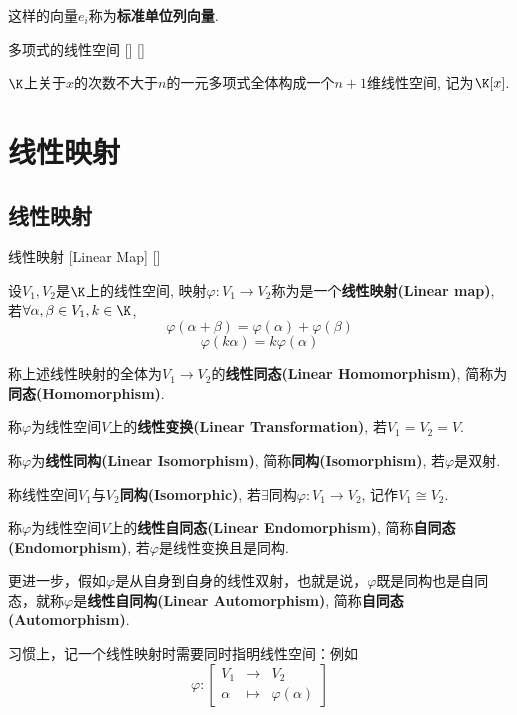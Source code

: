 \documentclass[UTF8]{ctexart}
\begin{document}
\begin{xmp}
			这样的向量$e_i$称为\textbf{标准单位列向量}. 
		\end{xmp}
		
		\begin{xmp}
			[]
			{多项式的线性空间}
			[]
			[]

			$\K$上关于$x$的次数不大于$n$的一元多项式全体构成一个$n+1$维线性空间, 记为$\K[x]$. 
		\end{xmp}
		
		
		
\section{线性映射}

	\subsection{线性映射}
		
		\begin{dfn}
			[]
			{线性映射}
			[Linear Map]
			[]

			设$V_{1},V_{2}$是$\K$上的线性空间, 映射$\varphi: V_{1}\to V_{2}$称为是一个\textbf{线性映射(Linear map)}, 若$\forall \alpha, \beta\in V_{1}, k\in \K$, 
			\[\varphi (\alpha+\beta)=\varphi(\alpha)+\varphi(\beta)\]
			\[\varphi(k\alpha)=k\varphi(\alpha)\]

			称上述线性映射的全体为$V_1\to V_2$的\textbf{线性同态(Linear Homomorphism)}, 简称为\textbf{同态(Homomorphism)}.
			
			称$\varphi$为线性空间$V$上的\textbf{线性变换(Linear Transformation)}, 若$V_{1}=V_{2}=V$. 
			
			称$\varphi$为\textbf{线性同构(Linear Isomorphism)}, 简称\textbf{同构(Isomorphism)}, 若$\varphi$是双射. 
			
			称线性空间$V_1$与$V_2$\textbf{同构(Isomorphic)}, 若$\exists$同构$\varphi:V_1\to V_2$, 记作$V_1\cong V_2$. 
			
			称$\varphi$为线性空间$V$上的\textbf{线性自同态(Linear Endomorphism)}, 简称\textbf{自同态(Endomorphism)}, 若$\varphi$是线性变换且是同构. 

			更进一步，假如$\varphi$是从自身到自身的线性双射，也就是说，$\varphi$既是同构也是自同态，就称$\varphi$是\textbf{线性自同构(Linear Automorphism)}, 简称\textbf{自同态(Automorphism)}.
		\end{dfn}

		习惯上，记一个线性映射时需要同时指明线性空间：例如
		\[\varphi:\begin{bmatrix}
			V_1&\to&V_2\\
			\alpha&\mapsto&\varphi(\alpha)
		\end{bmatrix}\]
		
\end{document}
